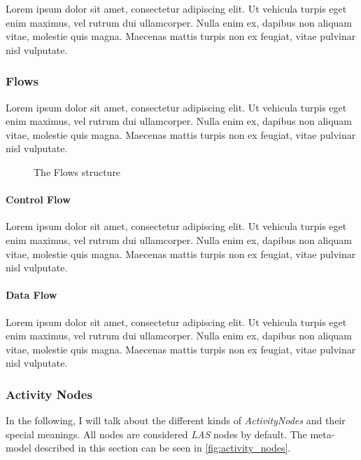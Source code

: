 Lorem ipsum dolor sit amet, consectetur adipiscing elit. Ut vehicula turpis eget enim maximus, vel rutrum dui ullamcorper. Nulla enim ex, dapibus non aliquam vitae, molestie quis magna. Maecenas mattis turpis non ex feugiat, vitae pulvinar nisl vulputate.

\subsubsection{Flows}\label{ssec:flows}

Lorem ipsum dolor sit amet, consectetur adipiscing elit. Ut vehicula turpis eget enim maximus, vel rutrum dui ullamcorper. Nulla enim ex, dapibus non aliquam vitae, molestie quis magna. Maecenas mattis turpis non ex feugiat, vitae pulvinar nisl vulputate.

\begin{figure}[!ht]
	\centering
	
	\caption{The Flows structure}
	\label{fig:flows}
\end{figure}

\paragraph{Control Flow}

Lorem ipsum dolor sit amet, consectetur adipiscing elit. Ut vehicula turpis eget enim maximus, vel rutrum dui ullamcorper. Nulla enim ex, dapibus non aliquam vitae, molestie quis magna. Maecenas mattis turpis non ex feugiat, vitae pulvinar nisl vulputate.

\paragraph{Data Flow}\label{par:data_flow}

Lorem ipsum dolor sit amet, consectetur adipiscing elit. Ut vehicula turpis eget enim maximus, vel rutrum dui ullamcorper. Nulla enim ex, dapibus non aliquam vitae, molestie quis magna. Maecenas mattis turpis non ex feugiat, vitae pulvinar nisl vulputate.

\subsubsection{Activity Nodes}\label{ssec:activity_nodes}

In the following, I will talk about the different kinds of \emph{ActivityNodes} and their special meanings. All nodes are considered \emph{LAS} nodes by default. The meta-model described in this section can be seen in \autoref{fig:activity_nodes}.

